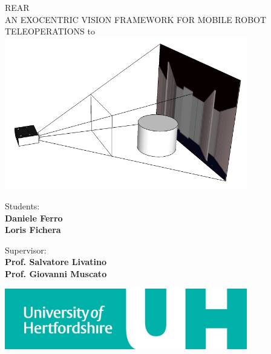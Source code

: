 \begin{titlepage}
  \begin{center}
    \uppercase{ \textsf{
        \LARGE{REAR} \\ 
        \vspace{0.5truecm}
        \large{an exocentric vision framework for mobile robot teleoperations}
    }}
    \hbox to \textwidth{\hrulefill}
    \vfill
    \includegraphics[width=300pt]{img/camera_frustum}
    \vfill
    
    \begin{flushright}
      \textsf{Students:} \\
      \textsf{\textbf{Daniele Ferro}} \\                      
      \textsf{\textbf{Loris Fichera}}
      \vspace{0.5 truecm}
                
      \textsf{Supervisor:} \\
      \textsf{\textbf{Prof. Salvatore Livatino }}\\
      \textsf{\textbf{Prof. Giovanni Muscato }}\\
    \end{flushright}
    
    \vspace{0.5 truecm}
    \hfill \includegraphics[width=300pt]{img/uni_logo.jpg}  %
    
  \end{center}
  
\end{titlepage}

\setlength{\baselineskip}{1.3\baselineskip} %

\tableofcontents

\newpage
